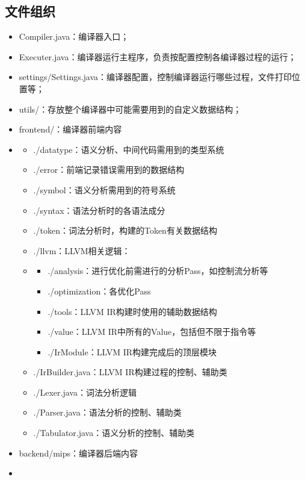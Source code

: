 \subsection{文件组织}
\begin{itemize}
    \item Compiler.java：编译器入口；
    \item Executer.java：编译器运行主程序，负责按配置控制各编译器过程的运行；
    \item settings/Settings.java：编译器配置，控制编译器运行哪些过程，文件打印位置等；
    \item utils/：存放整个编译器中可能需要用到的自定义数据结构；
    \item frontend/：编译器前端内容
    \item \begin{itemize}
        \item ./datatype：语义分析、中间代码需用到的类型系统
        \item ./error：前端记录错误需用到的数据结构
        \item ./symbol：语义分析需用到的符号系统
        \item ./syntax：语法分析时的各语法成分
        \item ./token：词法分析时，构建的Token有关数据结构
        \item ./llvm：LLVM相关逻辑：
        \item \begin{itemize}
            \item ./analysis：进行优化前需进行的分析Pass，如控制流分析等
            \item ./optimization：各优化Pass
            \item ./tools：LLVM IR构建时使用的辅助数据结构
            \item ./value：LLVM IR中所有的Value，包括但不限于指令等
            \item ./IrModule：LLVM IR构建完成后的顶层模块
        \end{itemize}
        \item ./IrBuilder.java：LLVM IR构建过程的控制、辅助类
        \item ./Lexer.java：词法分析逻辑
        \item ./Parser.java：语法分析的控制、辅助类
        \item ./Tabulator.java：语义分析的控制、辅助类
    \end{itemize}
    \item backend/mips：编译器后端内容
    \item \begin{itemize}

\end{itemize}
\end{itemize}
